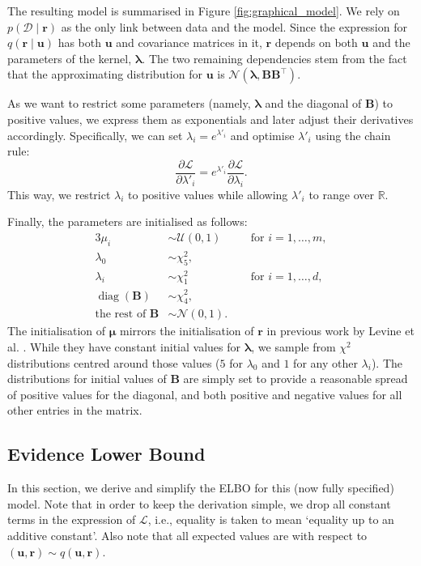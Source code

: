 \documentclass{mpaper}
\DeclareMathOperator{\diag}{diag}
\begin{document}
The resulting model is summarised in Figure \ref{fig:graphical_model}. We rely
on $p(\mathcal{D} \mid \mathbf{r})$ as the only link between data and the model.
Since the expression for $q(\mathbf{r} \mid \mathbf{u})$ has both $\mathbf{u}$
and covariance matrices in it, $\mathbf{r}$ depends on both $\mathbf{u}$ and the
parameters of the kernel, $\bm\lambda$. The two remaining dependencies stem from
the fact that the approximating distribution for $\mathbf{u}$ is
$\mathcal{N}(\bm\lambda, \mathbf{BB}^\intercal)$.

As we want to restrict some parameters (namely, $\bm\lambda$ and the diagonal of
$\mathbf{B}$) to positive values, we express them as exponentials and later
adjust their derivatives accordingly. Specifically, we can set $\lambda_i =
e^{\lambda'_i}$ and optimise $\lambda'_i$ using the chain rule:
\[
  \frac{\partial \mathcal{L}}{\partial \lambda'_i} = e^{\lambda'_i}
  \frac{\partial \mathcal{L}}{\partial \lambda_i}.
\]
This way, we restrict $\lambda_i$ to positive values while allowing $\lambda'_i$
to range over $\mathbb{R}$.

Finally, the parameters are initialised as follows:
\begin{alignat*}{3}
  \mu_i &\sim \mathcal{U}(0, 1) \quad &&\text{for } i = 1, \dots, m, \\
  \lambda_0 &\sim \chi^2_5, && \\
  \lambda_i &\sim \chi^2_1 \quad &&\text{for } i = 1, \dots, d, \\
  \diag(\mathbf{B}) &\sim \chi^2_4, && \\
  \text{the rest of } \mathbf{B} &\sim \mathcal{N}(0, 1). &&
\end{alignat*}
The initialisation of $\bm\mu$ mirrors the initialisation of $\mathbf{r}$ in
previous work by Levine et al. \cite{DBLP:conf/nips/LevinePK11}. While they have
constant initial values for $\bm\lambda$, we sample from $\chi^2$ distributions
centred around those values ($5$ for $\lambda_0$ and $1$ for any other
$\lambda_i$). The distributions for initial values of $\mathbf{B}$ are simply
set to provide a reasonable spread of positive values for the diagonal, and both
positive and negative values for all other entries in the matrix.

\subsection{Evidence Lower Bound} \label{sec:elbo}

In this section, we derive and simplify the ELBO for this (now fully specified)
model. Note that in order to keep the derivation simple, we drop all constant
terms in the expression of $\mathcal{L}$, i.e., equality is taken to mean
`equality up to an additive constant'. Also note that all expected values are
with respect to $(\mathbf{u}, \mathbf{r}) \sim q(\mathbf{u}, \mathbf{r})$.
\end{document}
